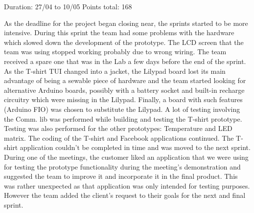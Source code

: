 Duration: 27/04 to 10/05\newline
Points total: 168

As the deadline for the project began closing near, the sprints started to be
more intensive. During this sprint the team had some problems with the hardware
which slowed down the development of the prototype. The LCD screen that the team
was using stopped working probably due to wrong wiring. The team received a
spare one that was in the Lab a few days before the end of the sprint. As the
T-shirt TUI changed into a jacket, the Lilypad board lost its main advantage
of being a sewable piece of hardware and the team started looking for alternative
Arduino boards, possibly with a battery socket and built-in recharge circuitry
which were missing in the Lilypad. Finally, a board with such features
(Arduino FIO) was chosen to substitute the Lilypad. A lot of testing involving
the Comm. lib was performed while building and testing the T-shirt prototype.
Testing was also performed for the other prototypes: Temperature and LED matrix.
The coding of the T-shirt and Facebook applications continued.
The T-shirt application couldn't be completed in time and was moved to the next
sprint. During one of the meetings, the customer liked an application that we
were using for testing the prototype functionality during the meeting's
demonstration and suggested the team to improve it and incorporate it in the
final product. This was rather unexpected as that application was only intended
for testing purposes. However the team added the client's request to their goals
for the next and final sprint.

